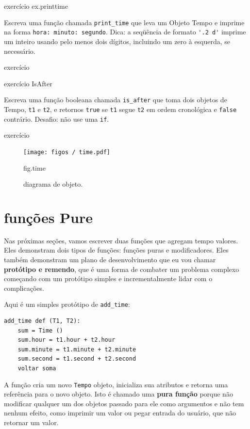 \documentclass[10pt]{book}
\begin{document}
\begin{v erbatim}
\begin{} exercício
\label{} ex.printtime

Escreva uma função chamada \verb "print_time" que leva um 
Objeto Tempo e imprime na forma {\tt hora: minuto: segundo}.
Dica: a seqüência de formato \verb "'.2 d'" imprime um inteiro usando
pelo menos dois dígitos, incluindo um zero à esquerda, se necessário.

\end{} exercício

\begin{} exercício
\label{} IsAfter

Escreva uma função booleana chamada \verb "is_after" que
toma dois objetos de Tempo, {\tt t1} e {\tt t2}, e
retornos {\tt true} se {\tt t1} segue {\tt t2} em ordem cronológica e
{\tt false} contrário. Desafio: não use uma {\tt if}.
\end{} exercício

\begin{figure}
\centerline
{\texttt{[image: figos / time.pdf]}}
\caption{diagrama de objeto.}
\label{} fig.time
\end{figure}


\section{funções Pure}

Nas próximas seções, vamos escrever duas funções que agregam tempo
valores. Eles demonstram dois tipos de funções: funções puras e
modificadores. Eles também demonstram um plano de desenvolvimento que eu vou chamar {\bf
  protótipo e remendo}, que é uma forma de combater um problema complexo
começando com um protótipo simples e incrementalmente lidar com o
complicações.

Aqui é um simples protótipo de \verb "add_time":

\begin{verbatim}
add_time def (T1, T2):
    sum = Time ()
    sum.hour = t1.hour + t2.hour
    sum.minute = t1.minute + t2.minute
    sum.second = t1.second + t2.second
    voltar soma
\end{verbatim}
%
A função cria um novo {\tt Tempo} objeto, inicializa sua
atributos e retorna uma referência para o novo objeto. Isto é chamado
uma {\bf pura função} porque não modificar qualquer um dos objetos
passado para ele como argumentos e não tem nenhum efeito,
como imprimir um valor ou pegar entrada do usuário, 
que não retornar um valor.


\end{v erbatim}
\end{document}
